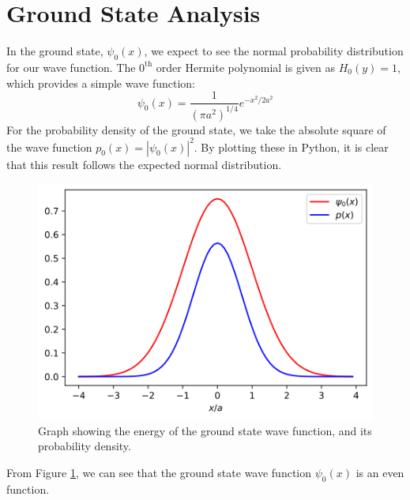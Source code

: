 \documentclass[a4paper]{article}
\begin{document}
\section{Ground State Analysis}
In the ground state, $\psi_0(x)$, we expect to see the normal probability distribution for our wave function. The $0^\text{th}$ order Hermite polynomial is given as $H_0(y)=1$, which provides a simple wave function:
\begin{equation}
\psi_0(x)=\frac1{(\pi a^2)^{1/4}}e^{-x^2/2a^2}
\end{equation}
For the probability density of the ground state, we take the absolute square of the wave function $p_0(x)=|\psi_0(x)|^2$. By plotting these in Python, it is clear that this result follows the expected normal distribution.
\begin{figure}[h!]
\centerline{\includegraphics[scale=0.7]{ground_state.png}}
\caption{Graph showing the energy of the ground state wave function, and its probability density.}
\label{fig:ground_state}
\end{figure}
From Figure \ref{fig:ground_state}, we can see that the ground state wave function $\psi_0(x)$ is an even function.
\end{document}
